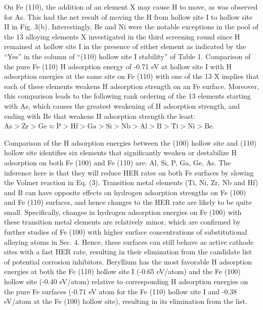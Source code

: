 On Fe (110), the addition of an element X may cause H to move, as was observed for As. This had the net result of moving the H from hollow site I to hollow site II in Fig. 3(b). Interestingly, Be and Ni were the notable exceptions in the pool of the 13 alloying elements X investigated in the third screening round since H remained at hollow site I in the presence of either element as indicated by the “Yes” in the column of “(110) hollow site I stability” of Table 1. Comparison of the pure Fe (110) H adsorption energy of -0.71 eV at hollow site I with H adsorption energies at the same site on Fe (110) with one of the 13 X implies that each of these elements weakens H adsorption strength on an Fe surface. Moreover, this comparison leads to the following rank ordering of the 13 elements starting with As, which causes the greatest weakening of H adsorption strength, and ending with Be that weakens H adsorption strength the least: $\text{As} > \text{Zr} > \text{Ge} \approx \text{P} > \text{Hf} > \text{Ga} > \text{Si} > \text{Nb} > \text{Al} > \text{B} > \text{Ti} > \text{Ni} > \text{Be}$.

Comparison of the H adsorption energies between the (100) hollow site and (110) hollow site identifies six elements that significantly weaken or destabilize H adsorption on both Fe (100) and Fe (110) are: Al, Si, P, Ga, Ge, As. The inference here is that they will reduce \ac{HER} rates on both Fe surfaces by slowing the Volmer reaction in Eq. (3). Transition metal elements (Ti, Ni, Zr, Nb and Hf) and B can have opposite effects on hydrogen adsorption strengths on Fe (100) and Fe (110) surfaces, and hence changes to the \ac{HER} rate are likely to be quite small. Specifically, changes in hydrogen adsorption energies on Fe (100) with these transition metal elements are relatively minor, which are confirmed by further studies of Fe (100) with higher surface concentrations of substitutional alloying atoms in Sec. 4. Hence, these surfaces can still behave as active cathode sites with a fast \ac{HER} rate, resulting in their elimination from the candidate list of potential corrosion inhibitors. Beryllium has the most favorable H adsorption energies at both the Fe (110) hollow site I (-0.65 eV/atom) and the Fe (100) hollow site (-0.40 eV/atom) relative to corresponding H adsorption energies on the pure Fe surfaces (-0.71 eV atom for the Fe (110) hollow site I and -0.38 eV/atom at the Fe (100) hollow site), resulting in its elimination from the list.

